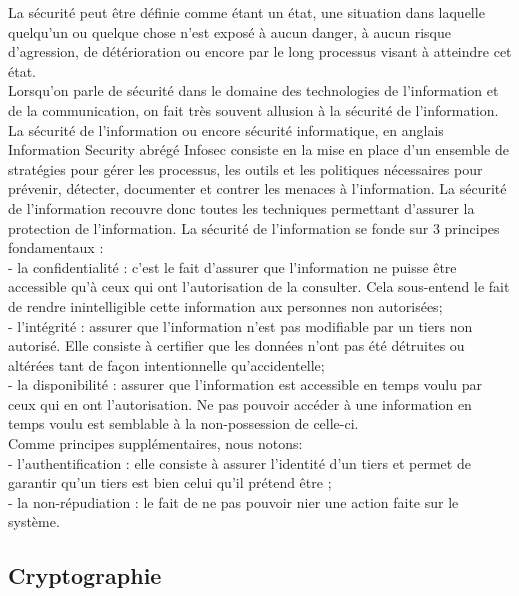 La sécurité peut être définie comme étant un état, une situation dans laquelle quelqu’un ou quelque chose n’est exposé à aucun danger, à aucun risque d’agression, de détérioration ou encore par le long processus visant à atteindre cet état. \\
Lorsqu’on parle de sécurité dans le domaine des technologies de l’information et de la communication, on fait très souvent allusion à la sécurité de l’information. La sécurité de l'information ou encore sécurité informatique, en anglais Information Security abrégé Infosec consiste en la mise en place d’un ensemble de stratégies pour gérer les processus, les outils et les politiques nécessaires pour prévenir, détecter, documenter et contrer les menaces à l'information. La sécurité de l’information recouvre donc toutes les techniques permettant d’assurer la protection de l’information.  La sécurité de l’information se fonde sur 3 principes fondamentaux : \\
-	la confidentialité : c’est le fait d’assurer que l’information ne puisse être accessible qu’à ceux qui ont l’autorisation de la consulter. Cela sous-entend le fait de rendre inintelligible cette information aux personnes non autorisées; \\
-	l’intégrité : assurer que l’information n’est pas modifiable par un tiers non autorisé. Elle consiste à certifier que les données n’ont pas été détruites ou altérées tant de façon intentionnelle qu’accidentelle; \\
-	la disponibilité : assurer que l’information est accessible en temps voulu par ceux qui en ont l’autorisation. Ne pas pouvoir accéder à une information en temps voulu est semblable à la non-possession de celle-ci.\\
Comme principes supplémentaires, nous notons:\\
-	l’authentification : elle consiste à assurer l’identité d’un tiers et permet de garantir qu’un tiers est bien celui qu’il prétend être ;\\
-	la non-répudiation : le fait de ne pas pouvoir nier une action faite sur le système.

\subsection{Cryptographie}

